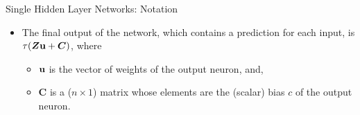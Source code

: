 \begin{vbframe}{Single Hidden Layer Networks: Notation}
\framebreak

  \begin{itemize}
    \vspace{15mm}
    \item The final output of the network, which contains a prediction for each input, is $\tau(\bm{Z}\mathbf{u} + \bm{C})$, where
      \begin{itemize}
        \vspace{2mm}
        \item $\mathbf{u}$ is the vector of weights of the output neuron, and,
        \vspace{2mm}
        \item $\bm{C}$ is a ($n \times 1$) matrix whose elements are the (scalar) bias $c$ of the output neuron.
      \end{itemize}
  \end{itemize}
\end{vbframe}
\endlecture
